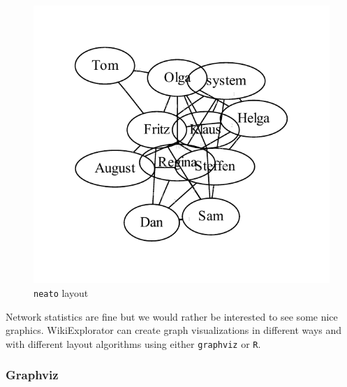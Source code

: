\documentclass[a4paper]{scrartcl}
\newcommand{\file}[1]{\texttt{\color{file}#1}}
\newcommand{\code}[1]{\texttt{\color{code}#1}}
\begin{document}
\begin{figure}
{  \includegraphics[width=\linewidth]{gv_ca-neato}\vspace{-7mm}
  \caption{\code{neato} layout}
  \label{fig:gv-caneato}}
\end{figure}

Network statistics are fine but we would rather be interested to see
some nice graphics. WikiExplorator can create graph visualizations in
different ways and with different layout algorithms using either
\file{graphviz} or \file{R}.

\subsubsection{Graphviz}
\label{sec:graphviz}
\end{document}
